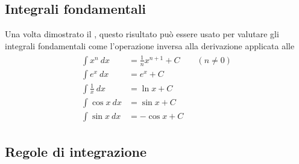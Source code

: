\documentclass[letterpaper,10pt,english]{jupyterBook}
\begin{document}
\subsection{Integrali fondamentali}
\label{\detokenize{ch/infinitesimal_calculus/integrals:integrali-fondamentali}}\label{\detokenize{ch/infinitesimal_calculus/integrals:infinitesimal-calculus-integrals-fund}}
\sphinxAtStartPar
Una volta dimostrato il {\hyperref[\detokenize{ch/infinitesimal_calculus/integrals:infinitesimal-calculus-integrals-thm-fund}]{}}, questo risultato può essere usato per valutare gli integrali fondamentali come l’operazione inversa alla derivazione applicata alle {\hyperref[\detokenize{ch/infinitesimal_calculus/integrals:infinitesimal-calculus-integrals-fund}]{}}
\begin{equation*}
\begin{split}\begin{aligned}
 \int x^n         \ dx & = \frac{1}{n} x^{n+1} + C  \qquad (n \neq 0) \\ 
 \int e^x         \ dx & = e^x                 + C \\ 
 \int \frac{1}{x} \ dx & = \ln x               + C \\ 
 \int \cos x      \ dx & = \sin x              + C \\ 
 \int \sin x      \ dx & =-\cos x              + C    
\end{aligned}\end{split}
\end{equation*}

\subsection{Regole di integrazione}
\label{\detokenize{ch/infinitesimal_calculus/integrals:regole-di-integrazione}}
\end{document}
